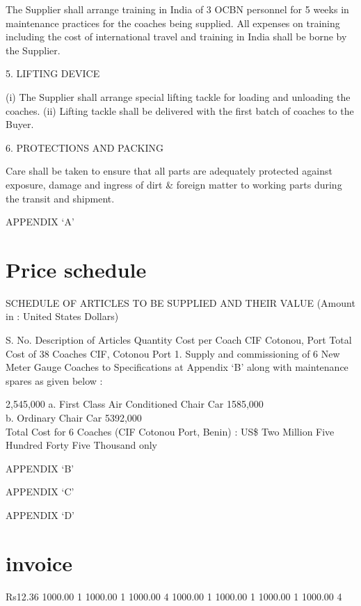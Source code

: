 \documentclass[12pt]{book}  %
\begin{document}
The Supplier shall arrange training in India of 3 OCBN personnel for 5 weeks in maintenance practices for the coaches being supplied. All expenses on training including the cost of international travel and training in India shall be borne by the Supplier.

5.	LIFTING DEVICE

(i) 	The Supplier shall arrange special lifting tackle for loading and unloading the coaches. 
(ii)	Lifting tackle shall be delivered with the first batch of coaches to the Buyer.

6. 	PROTECTIONS AND PACKING

Care shall be taken to ensure that all parts are adequately protected against exposure, damage and ingress of dirt \& foreign matter to working parts during the transit and shipment. 

APPENDIX ‘A’

\section{Price schedule}
SCHEDULE OF ARTICLES TO BE SUPPLIED AND THEIR VALUE
(Amount in : United States Dollars)


S.
No.
Description of Articles
Quantity
Cost per Coach CIF Cotonou, Port 
Total Cost of 38 Coaches CIF, Cotonou Port
1.
Supply and commissioning of 6 New Meter Gauge Coaches to Specifications at Appendix ‘B’ along with maintenance spares as given below :

2,545,000
a.  First Class Air Conditioned Chair Car   1585,000\\
b.  Ordinary Chair Car                      5392,000\\


Total Cost for 6 Coaches (CIF Cotonou Port, Benin) : US\$ Two Million Five Hundred Forty Five Thousand only






\newpage
APPENDIX ‘B’



\newpage

APPENDIX ‘C’



\newpage
APPENDIX ‘D’







\section{invoice}
    \begin{invoice}{Rs}{12.36}
       {1000.00} {1}
       {1000.00} {1}
       {1000.00} {4}
       {1000.00} {1}
       {1000.00} {1}
       {1000.00} {1}
       {1000.00} {4}
      
    \end{invoice}
\end{document}
